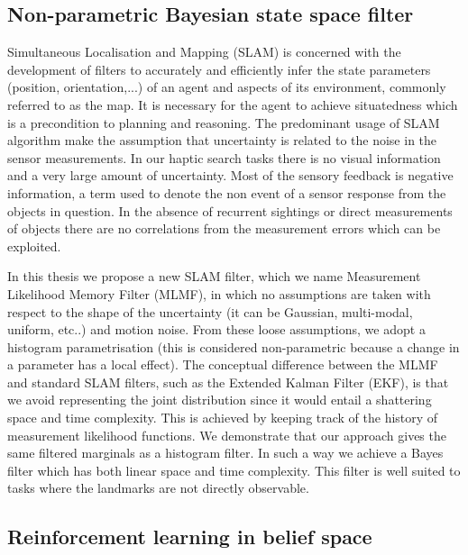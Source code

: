 \subsection{Non-parametric Bayesian state space filter}

Simultaneous Localisation and Mapping (SLAM) is concerned with the development of filters to accurately and efficiently infer 
the state parameters (position, orientation,...) of an agent and aspects of its environment, commonly referred to as the map. 
It is necessary for the agent to achieve situatedness which is a precondition to planning and reasoning. The 
predominant usage of SLAM algorithm make the assumption that uncertainty is related to the noise in the sensor measurements. In 
our haptic search tasks there is no visual information and a very large amount of uncertainty. Most of the sensory
feedback is negative information, a term used to denote the non event of a sensor response from the objects in question.
In the absence of recurrent sightings or direct measurements of objects there are no correlations from the measurement errors 
which can be exploited. 

In this thesis we propose a new SLAM filter, which we name Measurement Likelihood Memory Filter (MLMF), in 
which no assumptions are taken with respect to the shape of the uncertainty (it can be Gaussian, multi-modal, uniform, etc..) and 
motion noise. From these loose assumptions, we adopt a histogram parametrisation (this is considered non-parametric 
because a change in a parameter has a local effect). The conceptual difference between the MLMF and standard SLAM filters, 
such as the Extended Kalman Filter (EKF), is that we avoid representing the joint distribution since it would entail a shattering space and time complexity. 
This is achieved by keeping track of the history of measurement likelihood functions. We demonstrate that our approach gives 
the same filtered marginals as a histogram filter. In such a way we achieve a Bayes filter which has both linear space and 
time complexity. This filter is well suited to tasks where the landmarks are not directly observable.

\subsection{Reinforcement learning in belief space}

